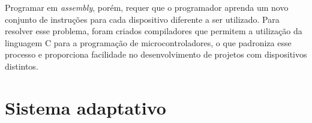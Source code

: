 Programar em \textit{assembly}, porém, requer que o programador aprenda um novo conjunto de instruções para cada dispositivo diferente a ser utilizado. Para resolver esse problema, foram criados compiladores que permitem a utilização da linguagem C para a programação de microcontroladores, o que padroniza esse processo e proporciona facilidade no desenvolvimento de projetos com dispositivos distintos.

\section{Sistema adaptativo}




